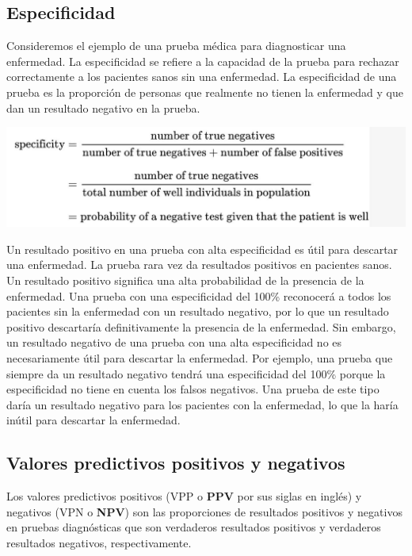 \documentclass[
]{book}
\begin{document}
\hypertarget{especificidad}{%
\subsection{Especificidad}\label{especificidad}}

Consideremos el ejemplo de una prueba médica para diagnosticar una enfermedad. La especificidad se refiere a la capacidad de la prueba para rechazar correctamente a los pacientes sanos sin una enfermedad. La especificidad de una prueba es la proporción de personas que realmente no tienen la enfermedad y que dan un resultado negativo en la prueba.

\includegraphics[width=15.18in]{img/spe}

Un resultado positivo en una prueba con alta especificidad es útil para descartar una enfermedad. La prueba rara vez da resultados positivos en pacientes sanos. Un resultado positivo significa una alta probabilidad de la presencia de la enfermedad. Una prueba con una especificidad del 100\% reconocerá a todos los pacientes sin la enfermedad con un resultado negativo, por lo que un resultado positivo descartaría definitivamente la presencia de la enfermedad. Sin embargo, un resultado negativo de una prueba con una alta especificidad no es necesariamente útil para descartar la enfermedad. Por ejemplo, una prueba que siempre da un resultado negativo tendrá una especificidad del 100\% porque la especificidad no tiene en cuenta los falsos negativos. Una prueba de este tipo daría un resultado negativo para los pacientes con la enfermedad, lo que la haría inútil para descartar la enfermedad.

\hypertarget{valores-predictivos-positivos-y-negativos}{%
\subsection{Valores predictivos positivos y negativos}\label{valores-predictivos-positivos-y-negativos}}

Los valores predictivos positivos (VPP o \textbf{PPV} por sus siglas en inglés) y negativos (VPN o \textbf{NPV}) son las proporciones de resultados positivos y negativos en pruebas diagnósticas que son verdaderos resultados positivos y verdaderos resultados negativos, respectivamente.
\end{document}
